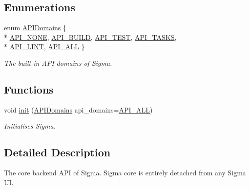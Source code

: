 \subsection*{Enumerations}
\begin{DoxyCompactItemize}
\item 
enum \hyperlink{namespacesigma_1_1core_a48ec553a4adec5e4ca04a94946e39227}{A\-P\-I\-Domains} \{ \\*
\hyperlink{namespacesigma_1_1core_a48ec553a4adec5e4ca04a94946e39227ad5c128a2a2f3f1354dc44fd6e477b2c9}{A\-P\-I\-\_\-\-N\-O\-N\-E}, 
\hyperlink{namespacesigma_1_1core_a48ec553a4adec5e4ca04a94946e39227a21b294c75f929374e9eebfa67e31d80b}{A\-P\-I\-\_\-\-B\-U\-I\-L\-D}, 
\hyperlink{namespacesigma_1_1core_a48ec553a4adec5e4ca04a94946e39227acd512ee6c623f9c4b6faafc279cb93c8}{A\-P\-I\-\_\-\-T\-E\-S\-T}, 
\hyperlink{namespacesigma_1_1core_a48ec553a4adec5e4ca04a94946e39227a165d0d460d4f55091c38bab695b27bb4}{A\-P\-I\-\_\-\-T\-A\-S\-K\-S}, 
\\*
\hyperlink{namespacesigma_1_1core_a48ec553a4adec5e4ca04a94946e39227aac7402732b780aa9407183ed7bd7c809}{A\-P\-I\-\_\-\-L\-I\-N\-T}, 
\hyperlink{namespacesigma_1_1core_a48ec553a4adec5e4ca04a94946e39227a5328f8d7cbf6b6709e5f314832bcb007}{A\-P\-I\-\_\-\-A\-L\-L}
 \}
\begin{DoxyCompactList}\small\item\em The built-\/in A\-P\-I domains of Sigma. \end{DoxyCompactList}\end{DoxyCompactItemize}
\subsection*{Functions}
\begin{DoxyCompactItemize}
\item 
void \hyperlink{namespacesigma_1_1core_ae59ffd8d8b483f24878a0bf7425c436c}{init} (\hyperlink{namespacesigma_1_1core_a48ec553a4adec5e4ca04a94946e39227}{A\-P\-I\-Domains} api\-\_\-domains=\hyperlink{namespacesigma_1_1core_a48ec553a4adec5e4ca04a94946e39227a5328f8d7cbf6b6709e5f314832bcb007}{A\-P\-I\-\_\-\-A\-L\-L})
\begin{DoxyCompactList}\small\item\em Initialises Sigma. \end{DoxyCompactList}\end{DoxyCompactItemize}


\subsection{Detailed Description}
The core backend A\-P\-I of Sigma. Sigma core is entirely detached from any Sigma U\-I. 

